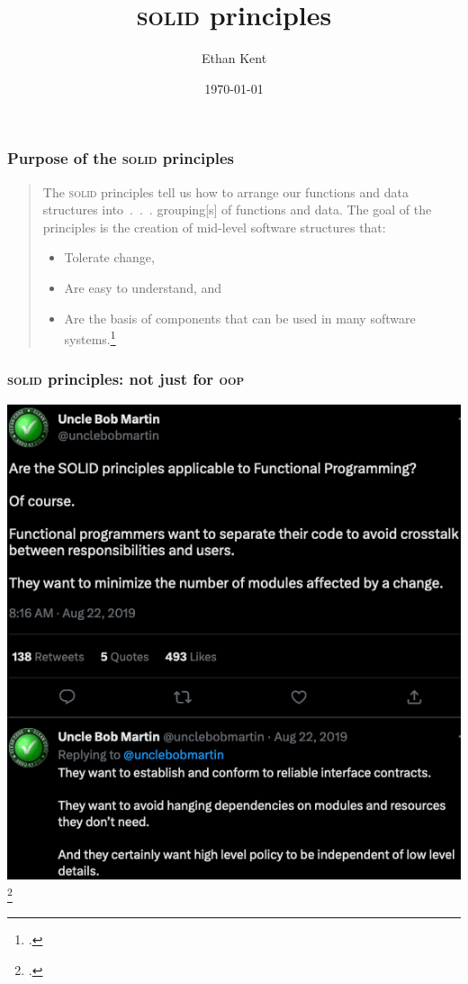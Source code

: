 \documentclass[aspectratio=169]{beamer}
\title{\textsc{solid} principles}
\author{Ethan Kent}
\institute{Spoonflower}
\date{\today}
\begin{document}
\frame{\titlepage}


\begin{frame}
  \frametitle{Purpose of the \textsc{solid} principles}
  \begin{quote}

    The \textsc{solid} principles tell us how to arrange our functions and data
    structures into~.~.~. grouping[s] of functions and data. The goal of the
    principles is the creation of mid-level software structures that:

    \begin{itemize}
      \item Tolerate change,
      \item Are easy to understand, and
      \item Are the basis of components that can be used in many software
            systems.\footnote{\cite[p.~58]{clean-arch}.}
    \end{itemize}

  \end{quote}
\end{frame}

\begin{frame}
  \frametitle{\textsc{solid} principles: not just for \textsc{oop}}
  \center
  \includegraphics[height=0.618\textheight]{bob-tweet}
  \footnote{\cite{martin-tweet}.}
\end{frame}
\end{document}
